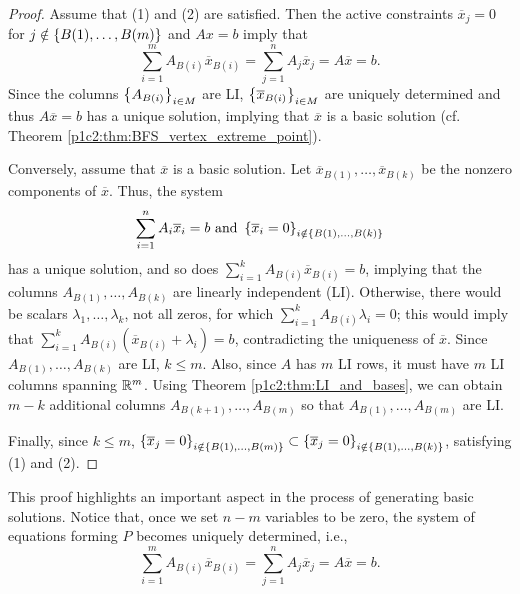 \begin{proof}
	Assume that (1) and (2) are satisfied. Then the active constraints $\overline{x}_j = 0$ for $j \notin \left\{ B(1), \dots, B(m) \right \}$ and $Ax = b$ imply that
%	
	\begin{equation*}
		\sum_{i=1}^m A_{B(i)}\overline{x}_{B(i)} = \sum_{j=1}^n A_j\overline{x}_j = A\overline{x} = b.
	\end{equation*}
%
	Since the columns $\left\{ A_{B(i)} \right \}_{i \in M}$ are LI, $\left\{ \overline{x}_{B(i)} \right \}_{i \in M}$ are uniquely determined and thus $A\overline{x} = b$ has a unique solution, implying that $\overline{x}$ is a basic solution (cf. Theorem \ref{p1c2:thm:BFS_vertex_extreme_point}).
	
	Conversely, assume that $\overline{x}$ is a basic solution. Let $\overline{x}_{B(1)}, \dots, \overline{x}_{B(k)}$ be the nonzero components of $\overline{x}$. Thus, the system 
%	
		\begin{equation*}
			\sum_{i=1}^n A_i\overline{x}_i = b \text{ and } \left\{ \overline{x}_i = 0 \right \}_{i \notin \left\{ B(1), \dots, B(k) \right \}}
		\end{equation*}
%
	has a unique solution, and so does $\sum_{i=1}^k A_{B(i)}\overline{x}_{B(i)} = b$, implying that the columns $A_{B(1)}, \dots, A_{B(k)}$ are linearly independent (LI). Otherwise, there would be scalars $\lambda_1,\dots, \lambda_k$, not all zeros, for which $\sum_{i=1}^k A_{B(i)}\lambda_i = 0$; this would imply that $\sum_{i=1}^k A_{B(i)}(\overline{x}_{B(i)} + \lambda_i) =b$, contradicting the uniqueness of $\overline{x}$.
	Since $A_{B(1)}, \dots, A_{B(k)}$ are LI, $k \leq m$. Also, since $A$ has $m$ LI rows, it must have $m$ LI columns spanning $\mathbb{R}^m$. Using Theorem \ref{p1c2:thm:LI_and_bases}, we can obtain $m-k$ additional columns $A_{B(k+1)}, \dots, A_{B(m)}$ so that $A_{B(1)}, \dots, A_{B(m)}$ are LI. 
	
	Finally, since $k \leq m $, $\left\{ \overline{x}_j = 0 \right \}_{i \notin \left\{ B(1), \dots, B(m) \right \}} \subset  \left\{ \overline{x}_j = 0 \right \}_{i \notin \left\{ B(1), \dots, B(k) \right \}}$, satisfying (1) and (2). \qedhere 		
\end{proof}	

This proof highlights an important aspect in the process of generating basic solutions. Notice that, once we set $n-m$ variables to be zero, the system of equations forming $P$ becomes uniquely determined, i.e., 
%
\begin{equation*}
	\sum_{i=1}^m A_{B(i)}\overline{x}_{B(i)} = \sum_{j=1}^n A_j\overline{x}_j = A\overline{x} = b.
\end{equation*}	
%


